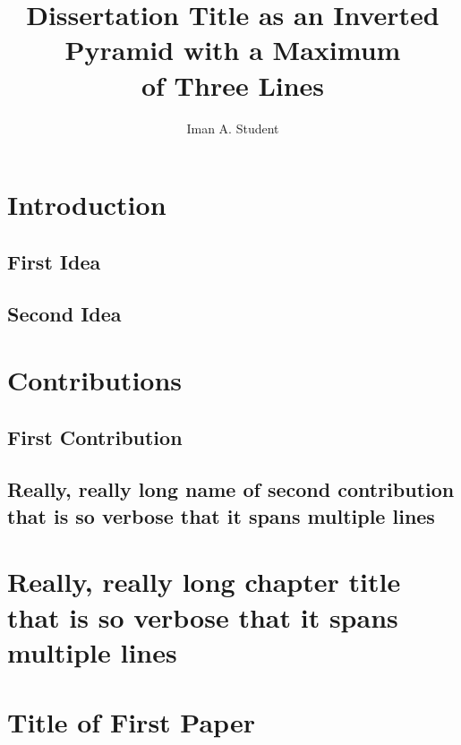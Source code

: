 \documentclass{BYUthesis} %
\title{Dissertation Title as an Inverted\\
Pyramid with a Maximum\\
of Three Lines}
\author{Iman A. Student}
\begin{document}

\chapter{Introduction}
\lipsum[3]
\section{First Idea}
\lipsum[2]
\section{Second Idea}
\lipsum[4]
\chapter{Contributions}
\lipsum[2]
\section{First Contribution}
\lipsum[4]
\section{Really, really long name of second contribution that is so verbose that it spans multiple lines}
\lipsum[1]
\chapter{Really, really long chapter title that is so verbose that it spans multiple lines}
\lipsum[2]


\appendix
\chapter{Title of First Paper}
\lipsum[2]
\end{document}
